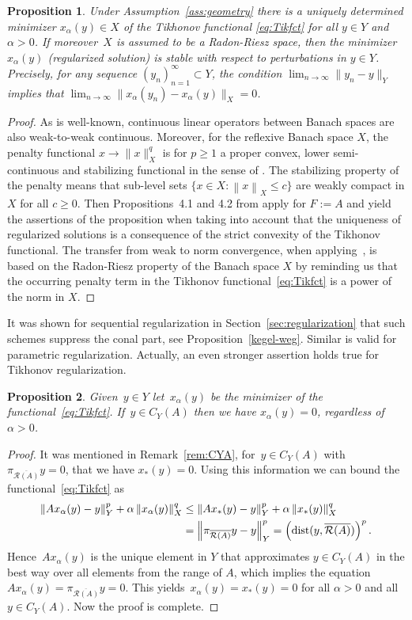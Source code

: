 \documentclass[12pt]{amsart}
\newcommand{\norm}[2]{\left\|#1\right\|_{#2}}
\newcommand{\lr}[1]{\left(#1\right)}
\newcommand{\range}{\mathcal R}
\newcommand{\xast}{x_\ast}
\newcommand{\pr}{\pi_{\overline{\range(A)}}}
\newtheorem{proposition}{Proposition}%
\theoremstyle{remark}
\begin{document}
\begin{proposition}\label{pro:Tikexist}
Under Assumption~\ref{ass:geometry} there is a uniquely determined minimizer $x_\alpha(y) \in X$ of the Tikhonov functional \eqref{eq:Tikfct} for all $y \in Y$ and $\alpha>0$. If moreover~$X$ is assumed to be a Radon-Riesz space, then
the minimizer $x_\alpha(y)$ (regularized solution) is stable with respect to perturbations in $y \in Y$. Precisely, for any
sequence $(y_n)_{n=1}^\infty \subset Y$, the condition
$\lim_{n \to \infty}\|y_n-y\|_Y$ implies that $\lim_{n \to \infty}\|x_\alpha(y_n)-x_\alpha(y)\|_X=0$.
\end{proposition}
\begin{proof}
As is well-known, continuous linear operators between Banach spaces
are also weak-to-weak continuous. Moreover, for the reflexive Banach
space $X$, the penalty functional $x \to \|x\|_X^q$ is for $p \ge 1$ a
proper convex, lower semi-continuous and stabilizing functional in the
sense of \cite[Ass.~3.22]{MR2963507}. The stabilizing property of the
penalty means that sub-level sets $\{x \in X: \norm{x}{X} \le c\}$ are weakly compact in $X$ for all $c\ge 0$. Then  Propositions~4.1 and 4.2 from \cite{MR2963507} apply for $F:=A$ and yield the assertions of the proposition when taking into account that the uniqueness of regularized solutions is a consequence of the strict convexity of the Tikhonov functional.
The transfer from weak to norm convergence, when applying~\cite[Prop.~4.2]{MR2963507}, is based on the Radon-Riesz property of the Banach space $X$ by reminding us that the occurring penalty term in the Tikhonov functional~\eqref{eq:Tikfct} is a power of the norm in $X$.
\end{proof}
It was shown for sequential regularization in Section~\ref{sec:regularization} that such schemes suppress the conal part, see Proposition~\ref{kegel-weg}. Similar is valid for parametric regularization. Actually, an even stronger assertion holds true for Tikhonov regularization.
\begin{proposition}\label{prop:kegel-weg-tikhonov}
Given~$y\in Y$ let~$x_\alpha(y)$ be the minimizer of the functional~\eqref{eq:Tikfct}.
    If~$y\in C_Y(A)$ %
    then we have $x_\alpha(y)=0$, regardless of~$\alpha>0$.
\end{proposition}
\begin{proof}
   It was mentioned in Remark~\ref{rem:CYA}, for~$y\in C_Y(A)$ with $\pr y=0$, that we have $\xast(y)=0$. 
    Using this information we can bound the functional~\eqref{eq:Tikfct} as
    \begin{align*}
    \norm{A x_\alpha(y) - y}{Y}^p + \alpha\norm{x_\alpha(y)}{X}^q
    &\leq \norm{A \xast(y) - y}{Y}^p + \alpha\norm{\xast(y)}{X}^q \\
    &= \norm{\pr y - y}{Y}^p =\left({\rm dist}(y,\overline{\range(A)})\right)^p.
    \end{align*}
    Hence~$A x_\alpha(y)$ is the unique element in $Y$ that approximates $y\in C_Y(A)$ in the best way over all elements from the range of $A$, which implies the equation $A x_\alpha(y) = \pr y=0$. This yields~$x_\alpha(y) = \xast(y)=0$ for all $\alpha>0$
    and all $y \in C_Y(A)$. Now the proof is complete.
\end{proof}
\end{document}
